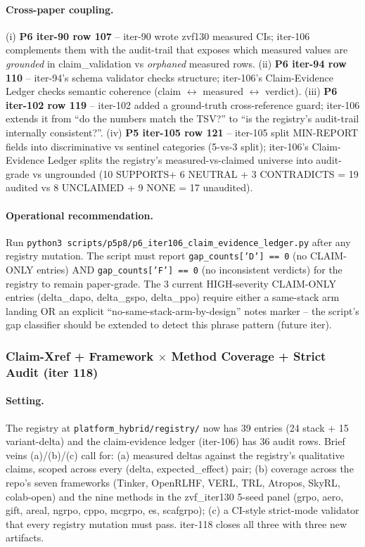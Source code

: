 \documentclass{article}
\begin{document}
\paragraph{Cross-paper coupling.}
(i) \textbf{P6 iter-90 row 107} -- iter-90 wrote zvf130 measured CIs;
iter-106 complements them with the audit-trail that exposes which measured
values are \emph{grounded} in claim\_validation vs \emph{orphaned} measured
rows. (ii) \textbf{P6 iter-94 row 110} -- iter-94's schema validator checks
structure; iter-106's Claim-Evidence Ledger checks semantic coherence
(claim $\leftrightarrow$ measured $\leftrightarrow$ verdict). (iii)
\textbf{P6 iter-102 row 119} -- iter-102 added a ground-truth
cross-reference guard; iter-106 extends it from ``do the numbers match the
TSV?'' to ``is the registry's audit-trail internally consistent?''. (iv)
\textbf{P5 iter-105 row 121} -- iter-105 split MIN-REPORT fields into
discriminative vs sentinel categories (5-vs-3 split); iter-106's
Claim-Evidence Ledger splits the registry's measured-vs-claimed universe
into audit-grade vs ungrounded (10 SUPPORTS+ 6 NEUTRAL + 3 CONTRADICTS =
19 audited vs 8 UNCLAIMED + 9 NONE = 17 unaudited).

\paragraph{Operational recommendation.}
Run \texttt{python3 scripts/p5p8/p6\_iter106\_claim\_evidence\_ledger.py}
after any registry mutation. The script must report
\texttt{gap\_counts['D'] == 0} (no CLAIM-ONLY entries) AND
\texttt{gap\_counts['F'] == 0} (no inconsistent verdicts) for the registry
to remain paper-grade. The 3 current HIGH-severity CLAIM-ONLY entries
(delta\_dapo, delta\_gspo, delta\_ppo) require either a same-stack arm
landing OR an explicit ``no-same-stack-arm-by-design'' notes marker -- the
script's gap classifier should be extended to detect this phrase pattern
(future iter). 

\subsubsection{Claim-Xref + Framework $\times$ Method Coverage + Strict Audit (iter 118)}
\label{sec:p6-iter118-claim-xref}

\paragraph{Setting.}
The registry at \texttt{platform_hybrid/registry/} now has 39 entries (24 stack + 15
variant-delta) and the claim-evidence ledger (iter-106) has 36 audit rows.
Brief veins (a)/(b)/(c) call for: (a) measured deltas against the registry's
qualitative claims, scoped across every (delta, expected\_effect) pair;
(b) coverage across the repo's seven frameworks
(Tinker, OpenRLHF, VERL, TRL, Atropos, SkyRL, colab-open) and the nine
methods in the zvf\_iter130 5-seed panel (grpo, aero, gift, areal, ngrpo,
cppo, mcgrpo, es, scafgrpo); (c) a CI-style strict-mode validator that
every registry mutation must pass. iter-118 closes all three with three
new artifacts.
\end{document}

